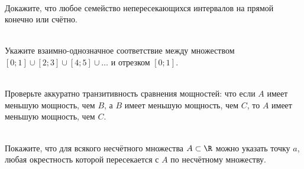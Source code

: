 \documentclass[a4paper,12pt,twoside]{article}
\begin{document}
\begin{?}\ \\
     Докажите, что любое семейство непересекающихся интервалов на прямой конечно или счётно.
\end{?}
\begin{?}\ \\
     Укажите взаимно-однозначное соответствие между множеством \([0; 1] \cup [2; 3] \cup [4; 5] \cup \ldots\) и отрезком \([0; 1]\).
\end{?}
\begin{?}\ \\
     Проверьте аккуратно транзитивность сравнения мощностей: что если \(A\) имеет меньшую мощность, чем \(B\), а \(B\) имеет меньшую мощность, чем \(C\), то \(A\) имеет меньшую мощность, чем \(C\).
\end{?}
\begin{?}\ \\
     Покажите, что для всякого несчётного множества \(A \subset \R\) можно указать точку \(a\), любая окрестность которой пересекается с \(A\) по несчётному множеству.
\end{?}
\end{document}
